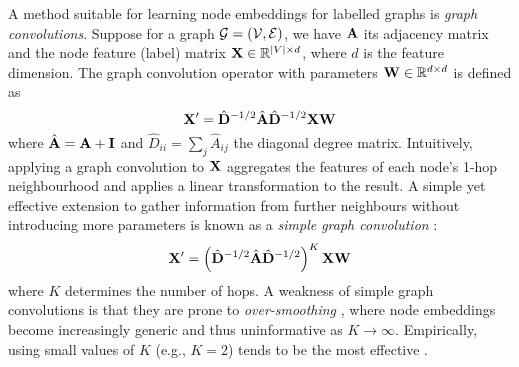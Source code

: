 A method suitable for learning node embeddings for labelled graphs is \emph{graph convolutions}. Suppose for a graph $\mathcal{G} = (\mathcal{V}, \mathcal{E})$, we have $\mathbf{A}$ its adjacency matrix and the node feature (label) matrix $\mathbf{X} \in \mathbb{R}^{|V| \times d}$, where $d$ is the feature dimension. The graph convolution operator with parameters $\mathbf{W} \in \mathbb{R}^{d \times d}$ is defined as
\[
    \mathbf{X}' = \hat{\mathbf{D}}^{-1/2} \hat{\mathbf{A}} \hat{\mathbf{D}}^{-1/2} \mathbf{X} \mathbf{W}
\]
where $\hat{\mathbf{A}} = \mathbf{A} + \mathbf{I}$ and $\hat{D}_{ii} = \sum_j \hat{A}_{ij}$ the diagonal degree matrix. Intuitively, applying a graph convolution to $\mathbf{X}$ aggregates the features of each node's 1-hop neighbourhood and applies a linear transformation to the result. A simple yet effective extension to gather information from further neighbours without introducing more parameters is known as a \emph{simple graph convolution} \cite{wu2019simplifying}:
\begin{equation}  \label{eq:simple-graph-conv}
    \mathbf{X}' = \left(\hat{\mathbf{D}}^{-1/2} \hat{\mathbf{A}} \hat{\mathbf{D}}^{-1/2}\right)^K \mathbf{X} \mathbf{W}
\end{equation}
where $K$ determines the number of hops. A weakness of simple graph convolutions is that they are prone to \emph{over-smoothing} \cite{zhu2020simple}, where node embeddings become increasingly generic and thus uninformative as $K \to \infty$. Empirically, using small values of $K$ (e.g., $K = 2$) tends to be the most effective \cite{wu2019simplifying}.